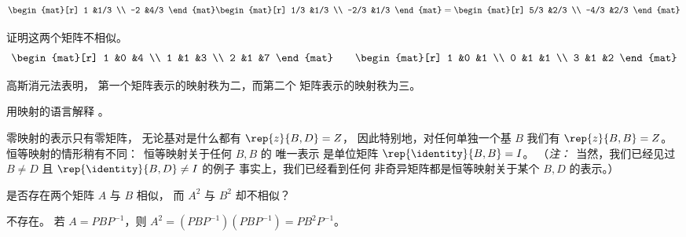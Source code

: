 \begin{exercises}
\begin{answer}
\begin{equation*}
\begin{mat}[r]
             1  &1/3 \\
            -2  &4/3
          \end{mat}
          \begin{mat}[r]
            1/3 &1/3 \\
           -2/3 &1/3
          \end{mat}
          =
          \begin{mat}[r]
            5/3 &2/3 \\
           -4/3 &2/3
          \end{mat}
       \end{equation*}  
    \end{answer}
  \recommended \item 
    证明这两个矩阵不相似。
    \begin{equation*}
       \begin{mat}[r]
          1  &0  &4  \\
          1  &1  &3  \\
          2  &1  &7
       \end{mat}
       \qquad
       \begin{mat}[r]
          1  &0  &1  \\
          0  &1  &1  \\
          3  &1  &2
       \end{mat}
    \end{equation*}
    \begin{answer}
      高斯消元法表明，
      第一个矩阵表示的映射秩为二，而第二个
      矩阵表示的映射秩为三。
    \end{answer}
  \item 
    用映射的语言解释 。
    \begin{answer}
      零映射的表示只有零矩阵，
      无论基对是什么都有 $\rep{z}{B,D}=Z$，
      因此特别地，对任何单独一个基 $B$ 我们有 $\rep{z}{B,B}=Z$。  
      恒等映射的情形稍有不同：~恒等映射关于任何 $B,B$ 的
      唯一表示
      是单位矩阵 $\rep{\identity}{B,B}=I$。
      （\textit{注：}~当然，我们已经见过 $B\neq D$ 且 
      $\rep{\identity}{B,D}\neq I$ 的例子 \Dash 事实上，我们已经看到任何 
      非奇异矩阵都是恒等映射关于某个 
      $B,D$ 的表示。）
    \end{answer}
  \recommended \item 
    \cite{Halmos}
    是否存在两个矩阵 \( A \) 与 \( B \) 相似，
    而 \( A^2 \) 与 \( B^2 \) 却不相似？
    \begin{answer}
      不存在。
      若 \( A=PBP^{-1} \)，则 \( A^2=(PBP^{-1})(PBP^{-1})=PB^2P^{-1} \)。

\end{answer}
\end{exercises}
